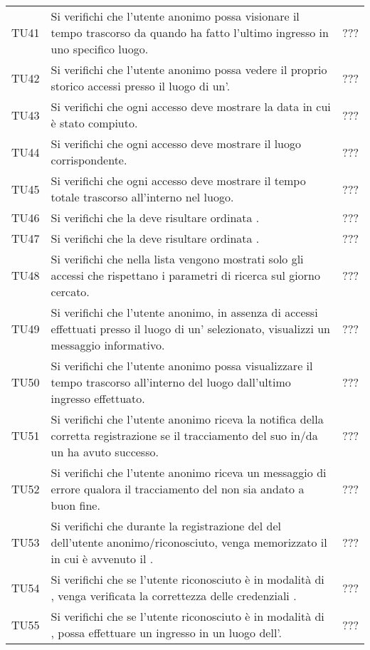 {\begin{longtable}{ c  C{9cm} C{1cm}}
TU41 & Si verifichi che l’utente anonimo possa visionare il tempo trascorso da quando ha fatto l'ultimo ingresso in uno specifico luogo. & ??? \\
TU42 & Si verifichi che l'utente anonimo possa vedere il proprio storico accessi presso il luogo di un'. & ??? \\
TU43 & Si verifichi che ogni accesso deve mostrare la data in cui è stato compiuto. & ??? \\
TU44 & Si verifichi che ogni accesso deve mostrare il luogo corrispondente. & ??? \\
TU45 & Si verifichi che ogni accesso deve mostrare il tempo totale trascorso all'interno nel luogo. & ??? \\
TU46 & Si verifichi che la  deve risultare ordinata . & ??? \\
TU47 & Si verifichi che la  deve risultare ordinata . & ??? \\
TU48 & Si verifichi che nella lista vengono mostrati solo gli accessi che rispettano i parametri di ricerca sul giorno cercato. & ??? \\
TU49 & Si verifichi che l'utente anonimo, in assenza di accessi effettuati presso il luogo di un' selezionato, visualizzi un messaggio informativo. & ??? \\
TU50 & Si verifichi che l'utente anonimo possa visualizzare il tempo trascorso all'interno del luogo dall'ultimo ingresso effettuato. & ??? \\
TU51 & Si verifichi che l’utente anonimo riceva la notifica della corretta registrazione se il tracciamento del suo  in/da un  ha avuto successo. & ??? \\
TU52 & Si verifichi che l’utente anonimo riceva un messaggio di errore qualora il tracciamento del  non sia andato a buon fine. & ??? \\
TU53 & Si verifichi che durante la registrazione del  del  dell'utente anonimo/riconosciuto, venga memorizzato il  in cui è avvenuto il . & ??? \\
TU54 & Si verifichi che se l'utente riconosciuto è in modalità di , venga verificata la correttezza delle credenziali . & ??? \\
TU55 & Si verifichi che se l'utente riconosciuto è in modalità di , possa effettuare un ingresso in un luogo dell'. & ??? \\

\end{longtable}}

